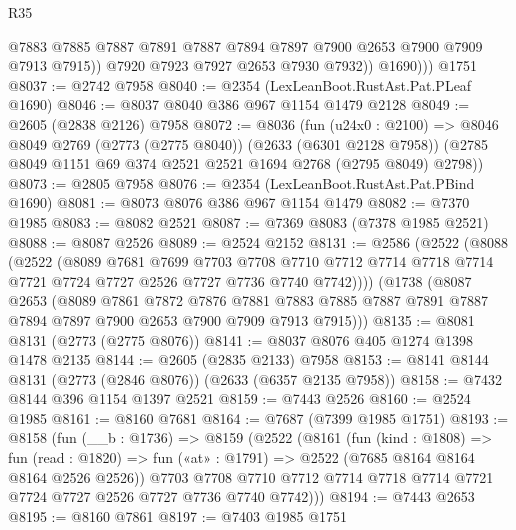 \begin{lexlean}{R35}
\begin{coremodule}
                @7883
                @7885
                @7887
                @7891
                @7887
                @7894
                @7897
                @7900
                @2653
                @7900
                @7909
                @7913
                @7915))
            @7920
            @7923
            @7927
            @2653
            @7930
            @7932))
          @1690)))
    @1751
@8037 := @2742 @7958
@8040 := @2354 (LexLeanBoot.RustAst.Pat.PLeaf @1690)
@8046 := @8037 @8040 @386 @967 @1154 @1479 @2128
@8049 := @2605 (@2838 @2126) @7958
@8072 := @8036
    (fun (u24x0 : @2100) =>
    @8046
      @8049
      @2769
      (@2773 (@2775 @8040))
      (@2633 (@6301 @2128 @7958))
      (@2785 @8049 @1151 @69 @374 @2521 @2521 @1694 @2768 (@2795 @8049) @2798))
@8073 := @2805 @7958
@8076 := @2354 (LexLeanBoot.RustAst.Pat.PBind @1690)
@8081 := @8073 @8076 @386 @967 @1154 @1479
@8082 := @7370 @1985
@8083 := @8082 @2521
@8087 := @7369 @8083 (@7378 @1985 @2521)
@8088 := @8087 @2526
@8089 := @2524 @2152
@8131 := @2586
    (@2522
      (@8088
        (@2522
          (@8089
            @7681
            @7699
            @7703
            @7708
            @7710
            @7712
            @7714
            @7718
            @7714
            @7721
            @7724
            @7727
            @2526
            @7727
            @7736
            @7740
            @7742))))
    (@1738
      (@8087
        @2653
        (@8089
          @7861
          @7872
          @7876
          @7881
          @7883
          @7885
          @7887
          @7891
          @7887
          @7894
          @7897
          @7900
          @2653
          @7900
          @7909
          @7913
          @7915)))
@8135 := @8081 @8131 (@2773 (@2775 @8076))
@8141 := @8037 @8076 @405 @1274 @1398 @1478 @2135
@8144 := @2605 (@2835 @2133) @7958
@8153 := @8141 @8144 @8131 (@2773 (@2846 @8076)) (@2633 (@6357 @2135 @7958))
@8158 := @7432 @8144 @396 @1154 @1397 @2521
@8159 := @7443 @2526
@8160 := @2524 @1985
@8161 := @8160 @7681
@8164 := @7687 (@7399 @1985 @1751)
@8193 := @8158
    (fun (__b : @1736) =>
    @8159
      (@2522
        (@8161
          (fun (kind : @1808) =>
          fun (read : @1820) => fun («at» : @1791) => @2522 (@7685 @8164 @8164 @8164 @2526 @2526))
          @7703
          @7708
          @7710
          @7712
          @7714
          @7718
          @7714
          @7721
          @7724
          @7727
          @2526
          @7727
          @7736
          @7740
          @7742)))
@8194 := @7443 @2653
@8195 := @8160 @7861
@8197 := @7403 @1985 @1751

\end{coremodule}
\end{lexlean}
